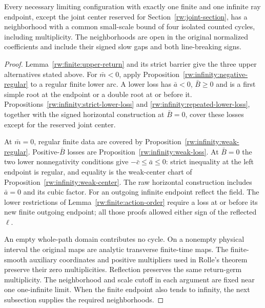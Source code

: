 \begin{proposition}
\label{rw:infinity:one-infinite}
Every necessary limiting configuration with exactly one finite and one
infinite ray endpoint, except the joint center reserved for
Section~\ref{rw:joint-section}, has a neighborhood with a common
small-scale bound of four isolated counted cycles, including multiplicity.
The neighborhoods are open in the original normalized coefficients
and include their signed slow gaps and both line-breaking signs.
\end{proposition}
\begin{proof}
Lemma~\ref{rw:finite:upper-return} and its strict barrier give the
three upper alternatives stated above. For $\bar m<0$, apply
Proposition~\ref{rw:infinity:negative-regular} to a regular finite
lower arc. A lower loss has $\bar a<0$, $\bar B\ge0$ and is a
first simple root at the endpoint or a double root at or before it.
Propositions~\ref{rw:infinity:strict-lower-loss} and
\ref{rw:infinity:repeated-lower-loss}, together with the signed
horizontal construction at $\bar B=0$, cover these losses except
for the reserved joint center.

At $\bar m=0$, regular finite data are covered by
Proposition~\ref{rw:infinity:weak-regular}. Positive-$\bar B$
losses are Proposition~\ref{rw:infinity:weak-loss}. At
$\bar B=0$ the two lower nonnegativity conditions give
$-\bar c\le\bar a\le0$: strict inequality at the left endpoint
is regular, and equality is the weak-center chart of
Proposition~\ref{rw:infinity:weak-center}. The raw horizontal
construction includes $\bar a=0$ and its cubic factor.
For an outgoing infinite endpoint reflect the field. The lower
restrictions of Lemma~\ref{rw:finite:action-order} require a loss
at or before its new finite outgoing endpoint; all those proofs
allowed either sign of the reflected $\ell$.

An empty whole-path domain contributes no cycle. On a nonempty
physical interval the original maps are analytic transverse
finite-time maps. The finite-smooth auxiliary coordinates and positive
multipliers used in Rolle's theorem preserve their zero multiplicities.
Reflection preserves the same return-germ multiplicity.
The neighborhood and scale cutoff in each argument are fixed near
one one-infinite limit. When the finite endpoint also tends to
infinity, the next subsection supplies the required neighborhoods.
\end{proof}
